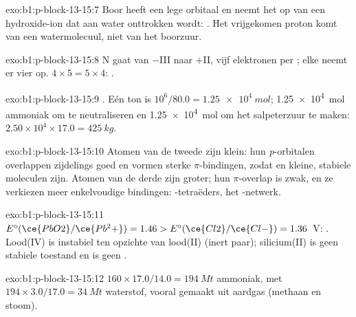 \begin{solution}{exo:b1:p-block-13-15:7}
Boor heeft een lege orbitaal en neemt het  op van een
hydroxide-ion dat aan water onttrokken wordt:
. Het vrijgekomen proton komt van een
watermolecuul, niet van het boorzuur.
\end{solution}

\begin{solution}{exo:b1:p-block-13-15:8}
N gaat van $-$III naar $+$II, vijf elektronen per ; elke 
neemt er vier op. $4 \times 5 = 5 \times 4$: .
\end{solution}

\begin{solution}{exo:b1:p-block-13-15:9}
. Eén ton is $10^6/80.0 = \qty{1.25e4}{mol}$;
\qty{1.25e4}{mol} ammoniak om te neutraliseren en \qty{1.25e4}{mol} om het
salpeterzuur te maken: $2.50 \times 10^4 \times 17.0 = \qty{425}{kg}$.
\end{solution}

\begin{solution}{exo:b1:p-block-13-15:10}
Atomen van de tweede  zijn klein: hun \textit{p}-orbitalen
overlappen zijdelings goed en vormen sterke $\pi$-bindingen, zodat
 en  kleine, stabiele moleculen zijn. Atomen van de
derde  zijn groter; hun $\pi$-overlap is zwak, en ze verkiezen meer
enkelvoudige bindingen: -tetraëders, het -netwerk.
\end{solution}

\begin{solution}{exo:b1:p-block-13-15:11}
$E^\circ(\ce{PbO2}/\ce{Pb^2+}) = 1.46 > E^\circ(\ce{Cl2}/\ce{Cl-}) = 1.36$~V:
. Lood(IV) is instabiel ten
opzichte van lood(II) (inert paar); silicium(II) is geen stabiele toestand
en  is geen .
\end{solution}

\begin{solution}{exo:b1:p-block-13-15:12}
$160 \times 17.0/14.0 = \qty{194}{Mt}$ ammoniak, met $194 \times
3.0/17.0 = \qty{34}{Mt}$ waterstof, vooral gemaakt uit aardgas (methaan en
stoom).
\end{solution}

